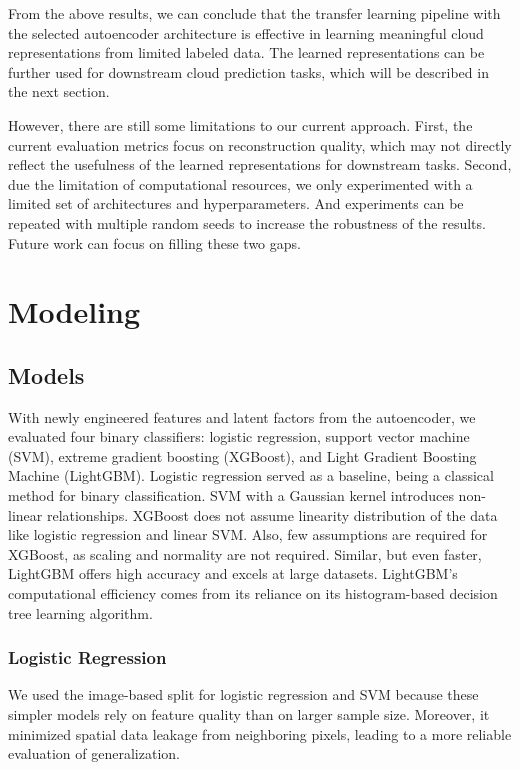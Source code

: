 \documentclass[10pt,letterpaper]{article}
\begin{document}
From the above results, we can conclude that the transfer learning pipeline with the selected autoencoder architecture is effective in learning meaningful cloud representations from limited labeled data. The learned representations can be further used for downstream cloud prediction tasks, which will be described in the next section.

However, there are still some limitations to our current approach. First, the current evaluation metrics focus on reconstruction quality, which may not directly reflect the usefulness of the learned representations for downstream tasks. Second, due the limitation of computational resources, we only experimented with a limited set of architectures and hyperparameters. And experiments can be repeated with multiple random seeds to increase the robustness of the results. Future work can focus on filling these two gaps.



\section{Modeling}


\subsection{Models}

With newly engineered features and latent factors from the autoencoder, we evaluated four binary classifiers: logistic regression, support vector machine (SVM), extreme gradient boosting (XGBoost), and Light Gradient Boosting Machine (LightGBM). Logistic regression served as a baseline, being a classical method for binary classification. SVM with a Gaussian kernel introduces non-linear relationships.
XGBoost does not assume linearity distribution of the data like logistic regression and linear SVM. Also, few assumptions are required for XGBoost, as scaling and normality are not required. Similar, but even faster, LightGBM offers high accuracy and excels at large datasets. LightGBM’s computational efficiency comes from its reliance on its histogram-based decision tree learning algorithm. 


\subsubsection{Logistic Regression}

We used the image-based split for logistic regression and SVM because these simpler models rely on feature quality than on larger sample size. Moreover, it minimized spatial data leakage from neighboring pixels, leading to a more reliable evaluation of generalization. 
\end{document}

